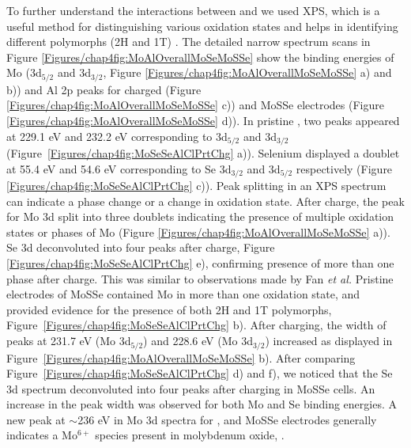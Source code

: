 To further understand the interactions between  and  we used XPS, which is a useful method for distinguishing various oxidation states and helps in identifying different polymorphs (2H and 1T) \cite{fan_hybrid_2017}. The detailed narrow spectrum scans in Figure \ref{Figures/chap4fig:MoAlOverallMoSeMoSSe} show the binding energies of Mo (3d$_{5/2}$ and 3d$_{3/2}$, Figure \ref{Figures/chap4fig:MoAlOverallMoSeMoSSe} a) and b)) and Al 2p peaks for charged  (Figure \ref{Figures/chap4fig:MoAlOverallMoSeMoSSe} c)) and MoSSe electrodes (Figure \ref{Figures/chap4fig:MoAlOverallMoSeMoSSe} d)). In pristine , two peaks appeared at 229.1 eV and 232.2 eV corresponding to 3d$_{5/2}$ and 3d$_{3/2}$ (Figure\ \ref{Figures/chap4fig:MoSeSeAlClPrtChg} a)). Selenium displayed a doublet at 55.4 eV and 54.6 eV corresponding to Se 3d$_{3/2}$ and 3d$_{5/2}$ respectively (Figure \ref{Figures/chap4fig:MoSeSeAlClPrtChg} c)). Peak splitting in an XPS spectrum can indicate a phase change or a change in oxidation state. After charge, the peak for Mo 3d split into three doublets indicating the presence of multiple oxidation states or phases of Mo (Figure \ref{Figures/chap4fig:MoAlOverallMoSeMoSSe} a)). Se 3d deconvoluted into four peaks after charge, Figure \ref{Figures/chap4fig:MoSeSeAlClPrtChg} e), confirming presence of more than one phase after charge. This was similar to observations made by Fan \textit{et al.} Pristine electrodes of MoSSe contained Mo in more than one oxidation state, and provided evidence for the presence of both 2H and 1T polymorphs, Figure\ \ref{Figures/chap4fig:MoSeSeAlClPrtChg} b). After charging, the width of peaks at 231.7 eV (Mo 3d$_{5/2}$) and 228.6 eV (Mo 3d$_{3/2}$) increased as displayed in Figure\ \ref{Figures/chap4fig:MoAlOverallMoSeMoSSe} b). After comparing Figure\ \ref{Figures/chap4fig:MoSeSeAlClPrtChg} d) and f), we noticed that the Se 3d spectrum deconvoluted into four peaks after charging in MoSSe cells. An increase in the peak width was observed for both Mo and Se binding energies. A new peak at $\sim$236 eV in Mo 3d spectra for ,  and MoSSe electrodes generally indicates a Mo$^{6+}$ species present in molybdenum oxide, . 

